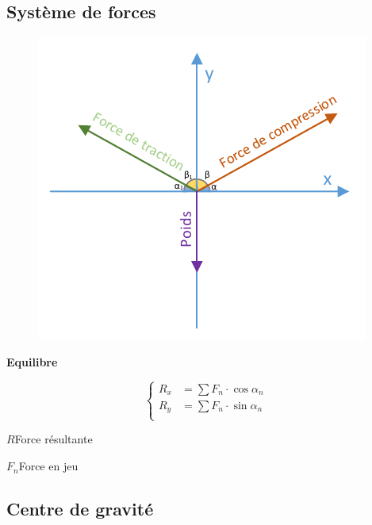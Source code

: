 \documentclass[12pt,a4paper]{article} %
\newcommand\frametitle[1]{ {\bfseries #1} \\[5pt] }
\begin{document}
\newpage

\subsection{Système de forces}

\begin{figure}[h]
	\centering
	\includegraphics{Statique-Axes}
\end{figure}

\begin{mdframed}
	\frametitle{Equilibre}
	\begin{twocols}
		\[\left\{
		\begin{aligned}
			R_x &= \sum F_n \cdot \cos \alpha_n \\
			R_y &= \sum F_n \cdot \sin \alpha_n \\
		\end{aligned}
	\right.\]
	\nextcol
		\begin{vardef}
			\item{$R$}{Force résultante}
			\item{$F_n$}{Force en jeu}
		\end{vardef}
	\end{twocols}
	
\end{mdframed}

\newpage

\subsection{Centre de gravité}

\newcommand\fcount[1]{\text{nombre de}\left(#1\right)}
\end{document}
